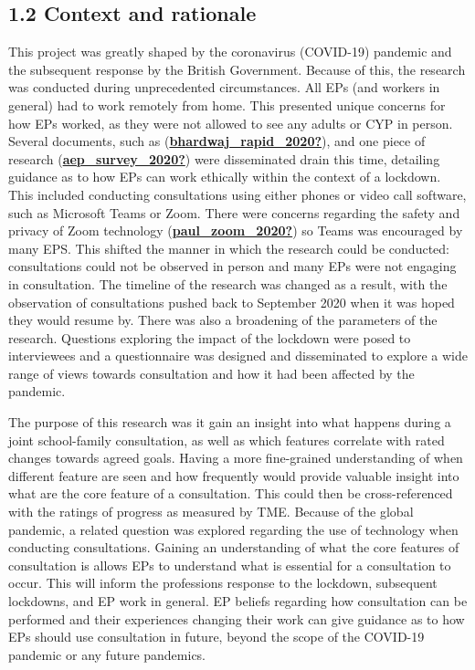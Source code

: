 \documentclass[
]{article}
\begin{document}
\hypertarget{context-and-rationale}{%
\subsection{1.2 Context and rationale}\label{context-and-rationale}}

This project was greatly shaped by the coronavirus (COVID-19) pandemic
and the subsequent response by the British Government. Because of this,
the research was conducted during unprecedented circumstances. All EPs
(and workers in general) had to work remotely from home. This presented
unique concerns for how EPs worked, as they were not allowed to see any
adults or CYP in person. Several documents, such as
(\protect\hyperlink{ref-bhardwaj_rapid_2020}{\textbf{bhardwaj\_rapid\_2020?}}),
and one piece of research
(\protect\hyperlink{ref-aep_survey_2020}{\textbf{aep\_survey\_2020?}})
were disseminated drain this time, detailing guidance as to how EPs can
work ethically within the context of a lockdown. This included
conducting consultations using either phones or video call software,
such as Microsoft Teams or Zoom. There were concerns regarding the
safety and privacy of Zoom technology
(\protect\hyperlink{ref-paul_zoom_2020}{\textbf{paul\_zoom\_2020?}}) so
Teams was encouraged by many EPS. This shifted the manner in which the
research could be conducted: consultations could not be observed in
person and many EPs were not engaging in consultation. The timeline of
the research was changed as a result, with the observation of
consultations pushed back to September 2020 when it was hoped they would
resume by. There was also a broadening of the parameters of the
research. Questions exploring the impact of the lockdown were posed to
interviewees and a questionnaire was designed and disseminated to
explore a wide range of views towards consultation and how it had been
affected by the pandemic.

The purpose of this research was it gain an insight into what happens
during a joint school-family consultation, as well as which features
correlate with rated changes towards agreed goals. Having a more
fine-grained understanding of when different feature are seen and how
frequently would provide valuable insight into what are the core feature
of a consultation. This could then be cross-referenced with the ratings
of progress as measured by TME. Because of the global pandemic, a
related question was explored regarding the use of technology when
conducting consultations. Gaining an understanding of what the core
features of consultation is allows EPs to understand what is essential
for a consultation to occur. This will inform the professions response
to the lockdown, subsequent lockdowns, and EP work in general. EP
beliefs regarding how consultation can be performed and their
experiences changing their work can give guidance as to how EPs should
use consultation in future, beyond the scope of the COVID-19 pandemic or
any future pandemics.
\end{document}
